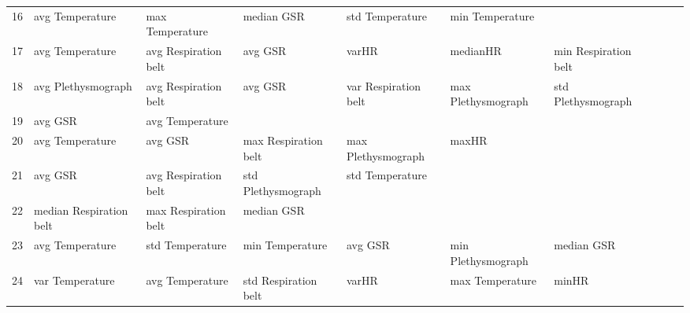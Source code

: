 \begin{landscape}
\begin{table}[]
\begin{tabular}{l|llllllll}
16       & avg Temperature         & max Temperature         & median GSR              & std Temperature         & min Temperature         &                       &                         &                         &                         &         \\
17       & avg Temperature         & avg Respiration belt    & avg GSR                 & varHR                   & medianHR                & min Respiration belt  &                         &                         &                         &         \\
18       & avg Plethysmograph      & avg Respiration belt    & avg GSR                 & var Respiration belt    & max Plethysmograph      & std Plethysmograph    &                         &                         &                         &         \\
19       & avg GSR                 & avg Temperature         &                         &                         &                         &                       &                         &                         &                         &         \\
20       & avg Temperature         & avg GSR                 & max Respiration belt    & max Plethysmograph      & maxHR                   &                       &                         &                         &                         &         \\
21       & avg GSR                 & avg Respiration belt    & std Plethysmograph      & std Temperature         &                         &                       &                         &                         &                         &         \\
22       & median Respiration belt & max Respiration belt    & median GSR              &                         &                         &                       &                         &                         &                         &         \\
23       & avg Temperature         & std Temperature         & min Temperature         & avg GSR                 & min Plethysmograph      & median GSR            &                         &                         &                         &         \\
24       & var Temperature         & avg Temperature         & std Respiration belt    & varHR                   & max Temperature         & minHR                 &                         &                         &                         &         \\

\end{tabular}
\end{table}
\end{landscape}
